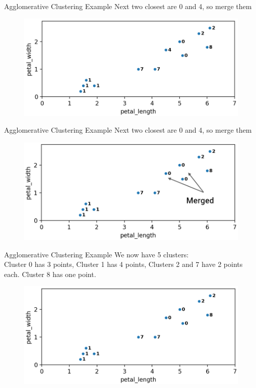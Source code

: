 \documentclass[aspectratio=169]{../latex_main/tntbeamer}  %
\begin{document}
	
	
	\begin{frame}{Agglomerative Clustering Example}
	    Next two closest are 0 and 4, so merge them
	    \begin{figure}
	        \centering
	        \includegraphics[scale=.35]{Bild42}
	    \end{figure}
	\end{frame}
	
	
	\begin{frame}{Agglomerative Clustering Example}
	    Next two closest are 0 and 4, so merge them
	    \begin{figure}
	        \centering
	        \includegraphics[scale=.35]{Bild43}
	    \end{figure}
	\end{frame}
	
	
	
	\begin{frame}{Agglomerative Clustering Example}
	    We now have 5 clusters:\\
Cluster 0 has 3 points, Cluster 1 has 4 points, Clusters 2 and 7 have 2 points each. Cluster 8 has one point.
	    \begin{figure}
	        \centering
	        \includegraphics[scale=.35]{Bild44}
	    \end{figure}
	\end{frame}
	
\end{document}
